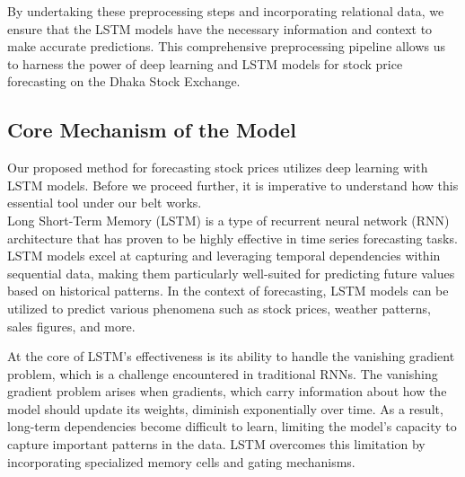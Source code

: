 \documentclass[conference]{IEEEtran}
\begin{document}
By undertaking these preprocessing steps and incorporating relational data, we ensure that the LSTM models have the necessary information and context to make accurate predictions. This comprehensive preprocessing pipeline allows us to harness the power of deep learning and LSTM models for stock price forecasting on the Dhaka Stock Exchange.




\subsection{Core Mechanism of the Model}
Our proposed method for forecasting stock prices utilizes deep learning with LSTM models. Before we proceed further, it is  imperative to understand how this essential tool under our belt works.\\
Long Short-Term Memory (LSTM) is a type of recurrent neural network (RNN) architecture that has proven to be highly effective in time series forecasting tasks. LSTM models excel at capturing and leveraging temporal dependencies within sequential data, making them particularly well-suited for predicting future values based on historical patterns. In the context of forecasting, LSTM models can be utilized to predict various phenomena such as stock prices, weather patterns, sales figures, and more.

At the core of LSTM's effectiveness is its ability to handle the vanishing gradient problem, which is a challenge encountered in traditional RNNs. The vanishing gradient problem arises when gradients, which carry information about how the model should update its weights, diminish exponentially over time. As a result, long-term dependencies become difficult to learn, limiting the model's capacity to capture important patterns in the data. LSTM overcomes this limitation by incorporating specialized memory cells and gating mechanisms.
\end{document}
